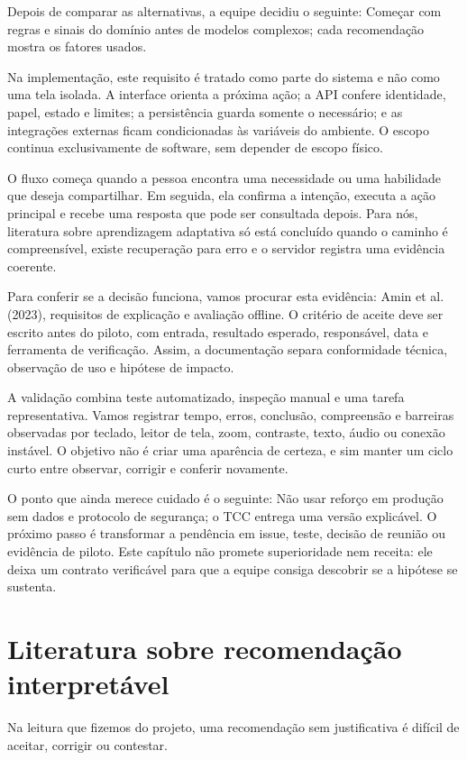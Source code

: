 \documentclass[12pt,oneside,a4paper,article]{abntex2}
\begin{document}
Depois de comparar as alternativas, a equipe decidiu o seguinte: Começar com regras e sinais do domínio antes de modelos complexos; cada recomendação mostra os fatores usados.

Na implementação, este requisito é tratado como parte do sistema e não como uma tela isolada. A interface orienta a próxima ação; a API confere identidade, papel, estado e limites; a persistência guarda somente o necessário; e as integrações externas ficam condicionadas às variáveis do ambiente. O escopo continua exclusivamente de software, sem depender de escopo físico.

O fluxo começa quando a pessoa encontra uma necessidade ou uma habilidade que deseja compartilhar. Em seguida, ela confirma a intenção, executa a ação principal e recebe uma resposta que pode ser consultada depois. Para nós, literatura sobre aprendizagem adaptativa só está concluído quando o caminho é compreensível, existe recuperação para erro e o servidor registra uma evidência coerente.

Para conferir se a decisão funciona, vamos procurar esta evidência: Amin et al. (2023), requisitos de explicação e avaliação offline. O critério de aceite deve ser escrito antes do piloto, com entrada, resultado esperado, responsável, data e ferramenta de verificação. Assim, a documentação separa conformidade técnica, observação de uso e hipótese de impacto.

A validação combina teste automatizado, inspeção manual e uma tarefa representativa. Vamos registrar tempo, erros, conclusão, compreensão e barreiras observadas por teclado, leitor de tela, zoom, contraste, texto, áudio ou conexão instável. O objetivo não é criar uma aparência de certeza, e sim manter um ciclo curto entre observar, corrigir e conferir novamente.

O ponto que ainda merece cuidado é o seguinte: Não usar reforço em produção sem dados e protocolo de segurança; o TCC entrega uma versão explicável. O próximo passo é transformar a pendência em issue, teste, decisão de reunião ou evidência de piloto. Este capítulo não promete superioridade nem receita: ele deixa um contrato verificável para que a equipe consiga descobrir se a hipótese se sustenta.

\section{Literatura sobre recomendação interpretável}
Na leitura que fizemos do projeto, uma recomendação sem justificativa é difícil de aceitar, corrigir ou contestar.
\end{document}
